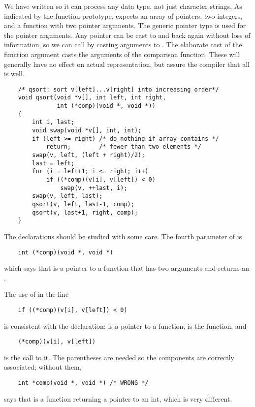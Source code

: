 We have written  so it can process any data type, not just character strings.
As indicated by the function prototype,  expects an array of pointers, two integers, and a function with two pointer arguments.
The generic pointer type  is used for the pointer arguments.
Any pointer can be cast to  and back again without loss of information, so we can call  by casting arguments to .
The elaborate cast of the function argument casts the arguments of the comparison function.
These will generally have no effect on actual representation, but assure the compiler that all is well.

\begin{lstlisting}
    /* qsort: sort v[left]...v[right] into increasing order*/
    void qsort(void *v[], int left, int right,
               int (*comp)(void *, void *))
    {
        int i, last;
        void swap(void *v[], int, int);
        if (left >= right) /* do nothing if array contains */
            return;        /* fewer than two elements */
        swap(v, left, (left + right)/2);
        last = left;
        for (i = left+1; i <= right; i++)
            if ((*comp)(v[i], v[left]) < 0)
                swap(v, ++last, i);
        swap(v, left, last);
        qsort(v, left, last-1, comp);
        qsort(v, last+1, right, comp);
    }
\end{lstlisting}

The declarations should be studied with some care. The fourth parameter of  is
\begin{lstlisting}
    int (*comp)(void *, void *)
\end{lstlisting}
which says that  is a pointer to a function that has two  arguments and returns an .

The use of  in the line
\begin{lstlisting}
    if ((*comp)(v[i], v[left]) < 0)
\end{lstlisting}
is consistent with the declaration:  is a pointer to a function,  is the function, and
\begin{lstlisting}
    (*comp)(v[i], v[left])
\end{lstlisting}
is the call to it.
The parentheses are needed so the components are correctly associated;
without them,
\begin{lstlisting}
    int *comp(void *, void *) /* WRONG */
\end{lstlisting}
says that  is a function returning a pointer to an int, which is very different.


